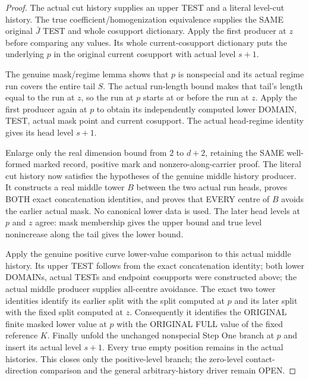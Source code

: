 \begin{proof}
The actual cut history supplies an upper TEST and a literal level-cut
history. The true coefficient/homogenization equivalence supplies the SAME
original $\bar J$ TEST and whole cosupport dictionary. Apply the first
producer at $z$ before comparing any values. Its whole current-cosupport
dictionary puts the underlying $p$ in the original current cosupport with
actual level $s+1$.

The genuine mask/regime lemma shows that $p$ is nonspecial and its actual
regime run covers the entire tail $S$. The actual run-length bound makes
that tail's length equal to the run at $z$, so the run at $p$ starts at or
before the run at $z$. Apply the first producer again at $p$ to obtain its
independently computed lower DOMAIN, TEST, actual mask point and current
cosupport. The actual head-regime identity gives its head level $s+1$.

Enlarge only the real dimension bound from $2$ to $d+2$, retaining the SAME
well-formed marked record, positive mark and nonzero-along-carrier proof.
The literal cut history now satisfies the hypotheses of the genuine middle
history producer. It constructs a real middle tower $B$ between the two
actual run heads, proves BOTH exact concatenation identities, and proves
that EVERY centre of $B$ avoids the earlier actual mask. No canonical lower
data is used. The later head levels at $p$ and $z$ agree: mask membership
gives the upper bound and true level nonincrease along the tail gives the
lower bound.

Apply the genuine positive curve lower-value comparison to this actual
middle history. Its upper TEST follows from the exact concatenation
identity; both lower DOMAINs, actual TESTs and endpoint cosupports were
constructed above; the actual middle producer supplies all-centre avoidance.
The exact two tower identities identify its earlier split with the split
computed at $p$ and its later split with the fixed split computed at $z$.
Consequently it identifies the ORIGINAL finite masked lower value at $p$
with the ORIGINAL FULL value of the fixed reference $K$. Finally unfold the
unchanged nonspecial Step One branch at $p$ and insert its actual level
$s+1$. Every true empty position remains in the actual histories. This
closes only the positive-level branch; the zero-level contact-direction
comparison and the general arbitrary-history driver remain OPEN.
\end{proof}
